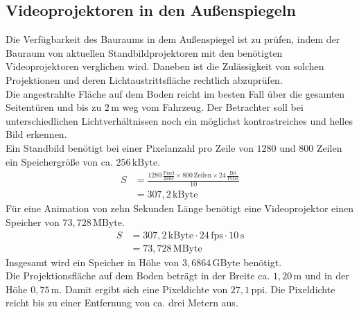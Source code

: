 \subsection{Videoprojektoren in den Außenspiegeln}
Die Verfügbarkeit des Bauraums in dem Außenspiegel ist zu prüfen, indem der Bauraum von aktuellen Standbildprojektoren mit den benötigten Videoprojektoren verglichen wird. 
Daneben ist die Zulässigkeit von solchen Projektionen und deren Lichtaustrittsfläche rechtlich abzuprüfen. \\
Die angestrahlte Fläche auf dem Boden reicht im besten Fall über die gesamten Seitentüren und bis zu $ 2\,\mathrm{m} $ weg vom Fahrzeug.
Der Betrachter soll bei unterschiedlichen Lichtverhältnissen noch ein möglichst kontrastreiches und helles Bild erkennen. \\
Ein Standbild benötigt bei einer Pixelanzahl pro Zeile von $ 1280 $ und $ 800 $ Zeilen ein Speichergröße von ca. $ 256\,\mathrm{kByte}$. 
\begin{align}
	S &= \frac{1280\,\frac{\mathrm{Pixel}}{\mathrm{Zeile}} \times 800\,\mathrm{Zeilen} \times 24\,\frac{\mathrm{Bit}}{\mathrm{Pixel}}}{10} \\
	&= 307,2\,\mathrm{kByte}
\end{align}
Für eine Animation von zehn Sekunden Länge benötigt eine Videoprojektor einen Speicher von $ 73,728\,\mathrm{MByte}$.
\begin{align}
	S &= 307,2\,\mathrm{kByte} \cdot 24\,\mathrm{fps} \cdot 10\,\mathrm{s}\\
	&= 73,728\,\mathrm{MByte} 
\end{align}
Insgesamt wird ein Speicher in Höhe von $ 3,6864\,\mathrm{GByte} $ benötigt. \\
Die Projektionsfläche auf dem Boden beträgt in der Breite ca. $ 1,20\,\mathrm{m} $ und in der Höhe $ 0,75\,\mathrm{m} $. Damit ergibt sich eine Pixeldichte von $ 27,1\,\mathrm{ppi} $. Die Pixeldichte reicht bis zu einer Entfernung von ca. drei Metern aus.
